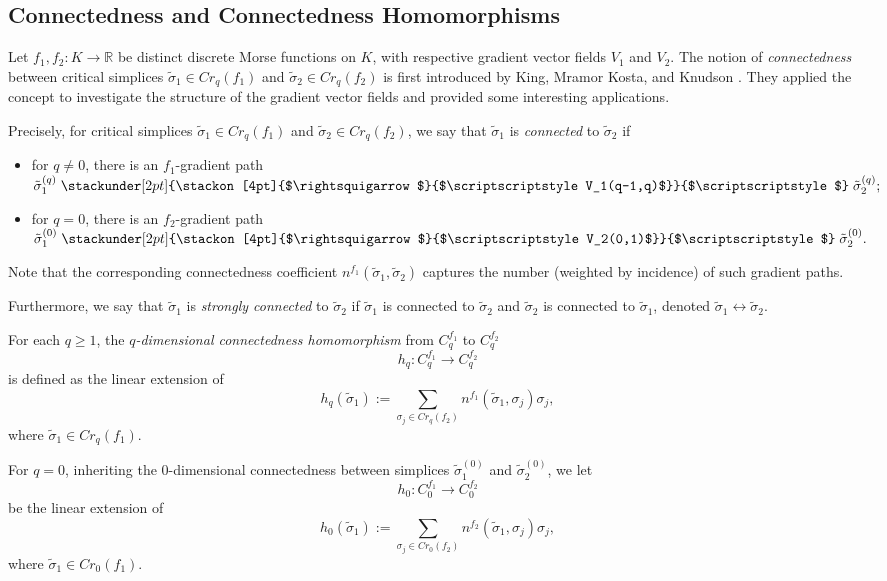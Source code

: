 \documentclass[a4paper,12pt,notitlepage]{amsart}
\theoremstyle{definition}%
\theoremstyle{definition}%
\theoremstyle{definition}%
\newcommand\stackrqarrow[2]{%
    \mathrel{\stackunder[2pt]{\stackon[4pt]{$\rightsquigarrow$}{$\scriptscriptstyle#1$}}{%
            $\scriptscriptstyle#2$}}}
\begin{document}
\subsection{Connectedness and  Connectedness Homomorphisms}


Let $f_1, f_2: K \to \mathbb{R} $ be distinct discrete
Morse functions on $K$,
with respective gradient vector fields $V_1$ and $V_2$.
The notion of  \textit{connectedness} between critical simplices $\tilde{\sigma}_1\in Cr_{q}(f_1)$ and 
$\tilde{\sigma}_2\in Cr_q(f_2)$ 
is first introduced by King, Mramor Kosta, and Knudson \cite{birth and death}.
They applied the concept to investigate the structure of the gradient vector fields 
and provided some interesting applications. 

Precisely,
for critical simplices $\tilde{\sigma}_1\in Cr_{q}(f_1)$ and 
$\tilde{\sigma}_2\in Cr_q(f_2)$, 
we  say that 
$\tilde{\sigma}_1$ 
is \textit{connected} to $\tilde{\sigma}_2$ if
\begin{itemize}
\item for $q\neq 0$, 
 there is an $f_1$-gradient path  
$\tilde{\sigma}_1^{(q)} \stackrqarrow{V_1(q-1,q)}{} \tilde{\sigma}_2^{(q)}; $

\item for $q=0$, 
there is an $f_2$-gradient path  
$\tilde{\sigma}_1^{(0)} \stackrqarrow{V_2(0,1)}{} \tilde{\sigma}_2^{(0)}.$
\end{itemize}

Note that the corresponding connectedness coefficient $n^{f_1}(\tilde{\sigma}_1,   \tilde{\sigma}_2)$ captures the number (weighted by incidence) of such 
gradient paths.


Furthermore,
we say that
$\tilde{\sigma}_1$ 
is \textit{strongly connected} to $\tilde{\sigma}_2$
if $\tilde{\sigma}_1$ 
is connected to $\tilde{\sigma}_2$ and 
$\tilde{\sigma}_2$ 
is connected to $\tilde{\sigma}_1$,
denoted    
$\tilde{\sigma}_1 \leftrightarrow \tilde{\sigma}_2.$

For each $q\geq 1$,
the \textit{$q$-dimensional connectedness homomorphism}
from $C_{q}^{f_1}$ to
$C_{q}^{f_2}$
$$h_q: C_{q}^{f_1} \to C_{q}^{f_2}$$
is defined as the linear extension of 
$$h_q(\tilde{\sigma}_1):= \sum_{\sigma_j\in Cr_q(f_2)} n^{f_1}(\tilde{\sigma}_1, \sigma_j) \sigma_j,$$
where $\tilde{\sigma}_1 \in Cr_q(f_1)$.

For $q=0$,
inheriting the $0$-dimensional connectedness between simplices $\tilde{\sigma}_1^{(0)}$ and 
$\tilde{\sigma}_2^{(0)}$, 
we let 
$$h_0: C_{0}^{f_1} \to C_{0}^{f_2}$$
be the linear extension of 
$$h_0(\tilde{\sigma}_1):= \sum_{\sigma_j\in Cr_0(f_2)} n^{f_2}(\tilde{\sigma}_1, \sigma_j) \sigma_j,$$
where $\tilde{\sigma}_1 \in Cr_0(f_1)$.
\end{document}
